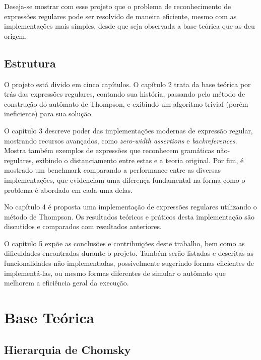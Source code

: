 \documentclass[a4paper,12pt,oneside,onecolumn]{uerj}
\begin{document}
Deseja-se mostrar com esse projeto que o problema de reconhecimento de expressões regulares pode ser resolvido de maneira eficiente, mesmo com as implementações mais simples, desde que seja observada a base teórica que as deu origem.

\section{Estrutura}

O projeto está divido em cinco capítulos. O capítulo 2 trata da base teórica por trás das expressões regulares, contando sua história, passando pelo método de construção do autômato de Thompson, e exibindo um algoritmo trivial (porém ineficiente) para sua solução.

O capítulo 3 descreve poder das implementações modernas de expressão regular, mostrando recursos avançados, como \emph{zero-width assertions} e \emph{backreferences}. Mostra também exemplos de expressões que reconhecem gramáticas não-regulares, exibindo o distanciamento entre estas e a teoria original. Por fim, é mostrado um benchmark comparando a performance entre as diversas implementações, que evidenciam uma diferença fundamental na forma como o problema é abordado em cada uma delas.

No capítulo 4 é proposta uma implementação de expressões regulares utilizando o método de Thompson. Os resultados teóricos e práticos desta implementação são discutidos e comparados com resultados anteriores.

O capítulo 5 expõe as conclusões e contribuições deste trabalho, bem como as dificuldades encontradas durante o projeto. Também serão listadas e descritas as funcionalidades não implementadas, possivelmente sugerindo formas eficientes de implementá-las, ou mesmo formas diferentes de simular o autômato que melhorem a eficiência geral da execução.

\chapter{Base Teórica}

\section{Hierarquia de Chomsky}
\end{document}

